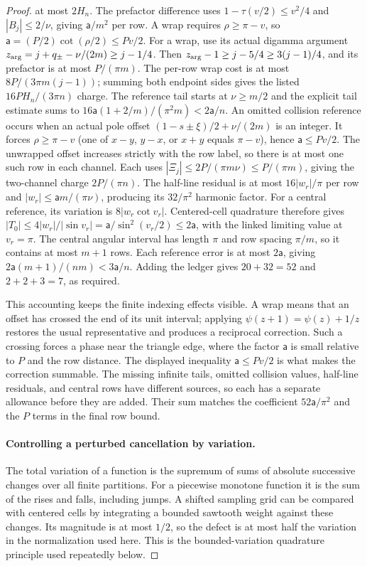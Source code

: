 \begin{proof}
at most $2H_n$. The prefactor difference uses
$1-\tau(v/2)\leq v^2/4$ and $|B_j|\leq2/\nu$, giving
$\mathsf{a}/m^2$ per row.
A wrap requires $\rho\geq\pi-v$, so
$\mathsf a=(P/2)\cot(\rho/2)\leq Pv/2$.
For a wrap, use its actual digamma argument
$z_{\rm arg}=j+q_\pm-\nu/(2m)\geq j-1/4$. Then
$z_{\rm arg}-1\geq j-5/4\geq3(j-1)/4$, and its prefactor is
at most $P/(\pi m)$. The per-row wrap cost is at most
$8P/(3\pi m(j-1))$; summing both endpoint sides gives the listed
$16PH_n/(3\pi n)$ charge. The reference tail starts at $\nu\geq m/2$ and
the explicit tail estimate sums to
$16\mathsf a(1+2/m)/(\pi^2m)<2\mathsf a/n$. An omitted collision reference occurs when an actual pole offset
$(1-s\pm\xi)/2+\nu/(2m)$ is an integer. It forces
$\rho\geq\pi-v$ (one of $x-y$, $y-x$, or $x+y$ equals $\pi-v$),
hence $\mathsf a\leq Pv/2$.
The unwrapped offset increases strictly with the row label, so there
is at most one such row in each channel. Each uses
$|\Xi_j|\leq2P/(\pi m\nu)\leq P/(\pi m)$, giving the two-channel
charge $2P/(\pi n)$.
The half-line residual is at most $16|w_r|/\pi$ per row and
$|w_r|\leq \mathsf{a}m/(\pi\nu)$, producing its $32/\pi^2$ harmonic factor.
For a central reference, its variation is $8|w_r\cot v_r|$.
Centered-cell quadrature therefore gives
$|T_0|\leq4|w_r|/|\sin v_r|=\mathsf a/\sin^2(v_r/2)\leq2\mathsf a$,
with the linked limiting value at $v_r=\pi$.
The central angular interval has length $\pi$ and row spacing
$\pi/m$, so it contains at most $m+1$ rows. Each reference error
is at most $2\mathsf{a}$, giving $2\mathsf{a}(m+1)/(nm)<3\mathsf{a}/n$. Adding the ledger gives $20+32=52$ and
$2+2+3=7$, as required.

This accounting keeps the finite indexing effects visible. A wrap
means that an offset has crossed the end of its unit interval; applying
$\psi(z+1)=\psi(z)+1/z$ restores the usual representative and produces
a reciprocal correction. Such a crossing forces a phase near the
triangle edge, where the factor $\mathsf{a}$ is small relative to $P$ and the
row distance. The displayed inequality $\mathsf{a}\leq Pv/2$ is what makes
the correction summable. The missing infinite tails, omitted collision
values, half-line residuals, and central rows have different sources,
so each has a separate allowance before they are added. Their sum
matches the coefficient $52\mathsf{a}/\pi^2$ and the $P$ terms in the final
row bound.

\paragraph{Controlling a perturbed cancellation by variation.}
The total variation of a function is the supremum of sums of absolute
successive changes over all finite partitions. For a piecewise monotone
function it is the sum of the rises and falls, including jumps.
A shifted sampling grid can be compared with centered cells by
integrating a bounded sawtooth weight against these changes. Its
magnitude is at most $1/2$, so the defect is at most half the variation
in the normalization used here. This is the bounded-variation
quadrature principle used repeatedly below.


\end{proof}
